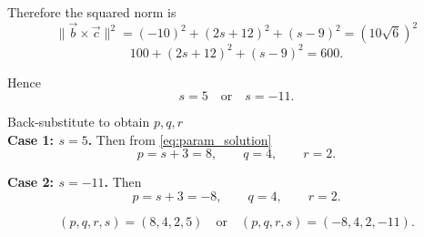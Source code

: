 \documentclass{beamer}
\begin{document}
\begin{frame}
Therefore the squared norm is
\begin{equation}\label{eq:norm_squared}
\|\vec{b}\times\vec{c}\|^2 = (-10)^2 + (2s+12)^2 + (s-9)^2 = (10\sqrt{6})^2
\end{equation}
\begin{equation}\label{eq:area_equation}
100 + (2s+12)^2 + (s-9)^2 = 600.
\end{equation}

Hence
\begin{equation}\label{eq:s_values}
s = 5 \quad\text{or}\quad s = -11.
\end{equation}

Back-substitute to obtain $p,q,r$\\
\noindent
\textbf{Case 1: $s=5$.} Then from \eqref{eq:param_solution}
\begin{equation}\label{eq:case1}
p = s+3 = 8,\qquad q=4,\qquad r=2.
\end{equation}

\textbf{Case 2: $s=-11$.} Then
\begin{equation}\label{eq:case2}
p = s+3 = -8,\qquad q=4,\qquad r=2.
\end{equation}

\begin{equation}\label{eq:final_answer}
(p,q,r,s) = (8,4,2,5)\quad\text{or}\quad (p,q,r,s)=(-8,4,2,-11).
\end{equation}

\end{frame}
\end{document}
